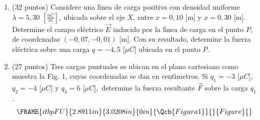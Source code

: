 \documentclass{article}
\begin{document}
\begin{enumerate}
\item (32 puntos) Considere una l\'{\i}nea de carga positiva con densidad
uniforme $\lambda =5,30$ $\left[ \frac{nC}{m}\right] $, ubicada sobre el eje 
$X$, entre $x=0,10$ [m] y $x=0,30$ [m]. Determine el campo el\'{e}ctrico $%
\vec{E}$ inducido por la l\'{\i}nea de carga en el punto $P$, de coordenadas 
$(-0,07,-0,01)$ [m]. Con su resultado, determine la fuerza el\'{e}ctrica
sobre una carga $q=-4,5$ [$\mu C$] ubicada en el punto $P.$\pagebreak 

\item (27 puntos) Tres cargas puntuales se ubican en el plano cartesiano
como muestra la Fig. 1, cuyas coordenadas se dan en cent\'{\i}metros. Si $%
q_{1}=-3$ [$\mu C$], $q_{2}=-4$ [$\mu C$] y $q_{3}=6$ [$\mu C$]$,$ determine
la fuerza resultante $\vec{F}$ sobre la carga $q_{1}$.%
\begin{equation*}
\FRAME{itbpFU}{2.8911in}{3.0208in}{0in}{\Qcb{Figura 1}}{}{Figure}{\special%
{language "Scientific Word";type "GRAPHIC";maintain-aspect-ratio
TRUE;display "USEDEF";valid_file "T";width 2.8911in;height 3.0208in;depth
0in;original-width 8.4267in;original-height 8.8047in;cropleft "0";croptop
"1";cropright "1";cropbottom "0";tempfilename
'SCELVV01.bmp';tempfile-properties "XPR";}}
\end{equation*}
\end{enumerate}
\end{document}
